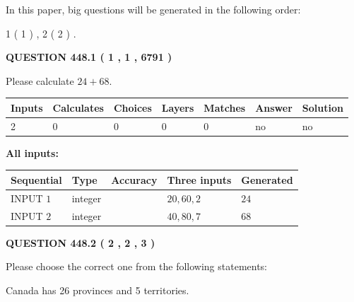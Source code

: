\documentclass[12pt]{article}
\begin{document}
In this paper, big questions will be generated in the following order: 
   
   
   1 ( 1 )
 ,
   2 ( 2 )
 .
  
\vspace{0.2in}
  
{\textbf{\Large{QUESTION
448.1 
 ( 1 , 1 , 6791 )
}}}
  
  
 
Please calculate $ %
24 +  %
68 $.
 
 
   
   
   
   
\noindent\begin{tabular}{|l|l|l|l|l|l|l|}
 \hline
Inputs & Calculates & Choices & Layers & Matches & Answer & Solution \\ \hline
 2  & 
 0  & 
 0
  & 
 0  & 
 0  & 
  no & 
  no 
  \\ \hline
 \end{tabular}
   
   
   
   
\noindent{}
   
   
   
   
\noindent\vspace{0.1in}\hspace{-0.08in} {\textbf{\Large{All inputs: }}}
   
   
  
  
\noindent\begin{tabular}{|l|l|l|l|l|}
\hline
 Sequential & Type & Accuracy & Three inputs & Generated \\ 
\hline
 
 
  INPUT $  1 $ & integer &  & $
 20
 , 
 60
 , 
 2
 $ & $ 24 $ 
 \\  \hline  
 
 
  INPUT $  2 $ & integer &  & $
 40
 , 
 80
 , 
 7
 $ & $ 68 $ 
 \\  \hline  
 \end{tabular}
   
   
  
\vspace{0.2in}
  
{\textbf{\Large{QUESTION
448.2 
 ( 2 , 2 , 3 )
}}}
  
  
Please choose the correct one from the following statements:
 
 
Canada has  26 provinces and  5 territories.
 
\end{document}

